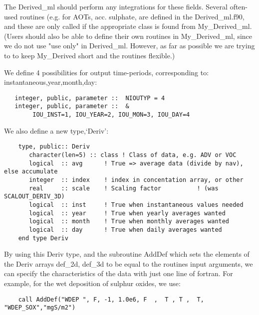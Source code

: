  The Derived\_ml should perform any integrations for these fields.
 Several often-used routines (e.g. for AOTs, acc. sulphate, are defined 
 in the Derived\_ml.f90, and these are only called if the appropriate
 class is found from My\_Derived\_ml. (Users should also be
 able to define their own routines in My\_Derived\_ml, since
 we do not use "use only" in Derived\_ml. However, as far as possible
 we are trying to to keep My\_Derived short and the routines flexible.)

  We define 4 possibilities
  for output time-periods, corresponding to: instantaneous,year,month,day:

  \begin{small}\begin{verbatim}
   integer, public, parameter ::  NIOUTYP = 4
   integer, public, parameter ::  & 
        IOU_INST=1, IOU_YEAR=2, IOU_MON=3, IOU_DAY=4
  \end{verbatim}
  \end{small}


   We also define a new type,`Deriv':

  \begin{small}\begin{verbatim}
    type, public:: Deriv
       character(len=5) :: class ! Class of data, e.g. ADV or VOC
       logical  :: avg      ! True => average data (divide by nav), else accumulate
       integer  :: index    ! index in concentation array, or other
       real     :: scale    ! Scaling factor          ! (was SCALOUT_DERIV_3D)
       logical  :: inst     ! True when instantaneous values needed
       logical  :: year     ! True when yearly averages wanted
       logical  :: month    ! True when monthly averages wanted
       logical  :: day      ! True when daily averages wanted
    end type Deriv
  \end{verbatim}
  \end{small}


  By using this Deriv type, and the subroutine AddDef which sets the elements of the
  Deriv arrays
  def\_2d, def\_3d to be equal to the routines input arguments, we can specify the characteristics of the data
  with just one line of fortran. For example, for the wet deposition of
  sulphur oxides, we use:


  \begin{small}
\begin{verbatim}
    call AddDef("WDEP ", F, -1, 1.0e6, F  ,  T , T ,  T, "WDEP_SOX","mgS/m2")
  \end{verbatim}
  \end{small}

